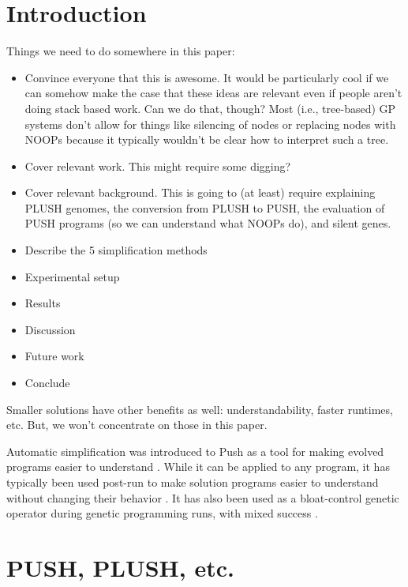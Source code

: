 \section{Introduction}
\label{sec:intro}


Things we need to do somewhere in this paper:
\begin{itemize}
	\item Convince everyone that this is awesome. It would be particularly cool if we can somehow make the case that these ideas are relevant even if people aren't doing stack based work. Can we do that, though? Most (i.e., tree-based)
	GP systems don't allow for things like silencing of nodes or replacing nodes
	with NOOPs because it typically wouldn't be clear how to interpret such a tree.
	\item Cover relevant work. This might require some digging?
	\item Cover relevant background. This is going to (at least) require explaining PLUSH genomes, the conversion from PLUSH to PUSH, the evaluation of PUSH programs (so we can understand what NOOPs do), and silent genes.
	\item Describe the 5 simplification methods
	\item Experimental setup
	\item Results
	\item Discussion
	\item Future work
	\item Conclude
\end{itemize}

Smaller solutions have other benefits as well: understandability, faster runtimes, etc. But, we won't concentrate on those in this paper.

Automatic simplification was introduced to Push as a tool for making evolved programs easier to understand \cite{Robinson:2001:GPtieus, spector:2002:GPEM}. While it can be applied to any program, it has typically been used post-run to make solution programs easier to understand without changing their behavior \cite{Spector:2014:GECCOcomp}. It has also been used as a bloat-control genetic operator during genetic programming runs, with mixed success \cite{Zhan:2014:GECCOcomp}. 

\section{PUSH, PLUSH, etc.}
\label{sec:push}

